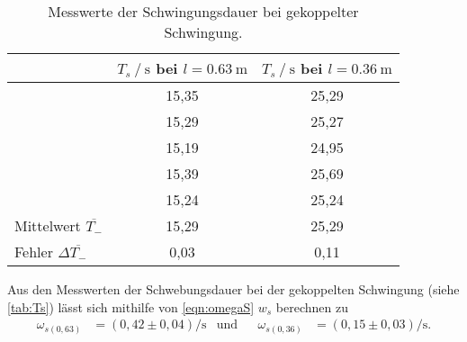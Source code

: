 \begin{table}[H]
  \centering
  \caption{Messwerte der Schwingungsdauer bei gekoppelter Schwingung.}
  \label{tab:Ts}
  \begin{tabular}{l S S}
    \toprule
     & {$T_s \mathbin{/} \si{\second}$ bei $l=\qty{0.63}{\meter}$} & {$T_s \mathbin{/} \si{\second}$ bei $l=\qty{0.36}{\meter}$}\\
    \midrule
      &15,35& 25,29\\
      &15,29& 25,27\\
      &15,19& 24,95\\
      &15,39& 25,69\\
      &15,24& 25,24\\
    \midrule
      Mittelwert $\overline{T_-}$& 15,29 & 25,29\\
      Fehler $\Delta \overline{T_-}$& 0,03 & 0,11\\
    \bottomrule
  \end{tabular}
\end{table}
Aus den Messwerten der Schwebungsdauer bei der gekoppelten Schwingung (siehe \autoref{tab:Ts}) lässt sich mithilfe
von \autoref{eqn:omegaS} $w_s$ berechnen zu 
\begin{align*}
  \omega_{s(0,63)}&=(0,42 \pm 0,04) \si{\per\second} & \text{und} && \omega_{s(0,36)}&=(0,15 \pm 0,03) \si{\per\second}.
\end{align*}






